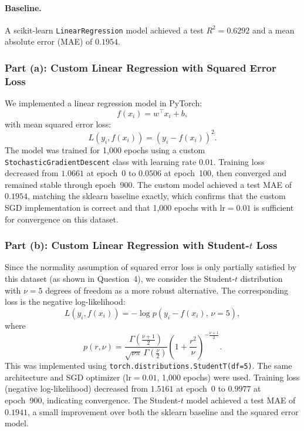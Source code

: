 \documentclass[11pt]{article}
\begin{document}
\paragraph{Baseline.}
A scikit-learn \texttt{LinearRegression} model achieved a test
$R^2 = 0.6292$ and a mean absolute error (MAE) of $\mathbf{0.1954}$.

\subsubsection*{Part (a): Custom Linear Regression with Squared Error Loss}

We implemented a linear regression model in PyTorch:
\[
    f(x_i) = w^\top x_i + b,
\]
with mean squared error loss:
\[
    L(y_i, f(x_i)) = (y_i - f(x_i))^2.
\]
The model was trained for 1{,}000 epochs using a custom
\texttt{StochasticGradientDescent} class with learning rate $0.01$.
Training loss decreased from $1.0661$ at epoch~0 to $0.0506$ at epoch~100,
then converged and remained stable through epoch~900. The custom model achieved
a test MAE of $\mathbf{0.1954}$, matching the sklearn baseline exactly,
which confirms that the custom SGD implementation is correct and that 1{,}000
epochs with $\text{lr}=0.01$ is sufficient for convergence on this dataset.

\subsubsection*{Part (b): Custom Linear Regression with Student-$t$ Loss}

Since the normality assumption of squared error loss is only partially
satisfied by this dataset (as shown in Question~4), we consider the
Student-$t$ distribution with $\nu = 5$ degrees of freedom as a more
robust alternative. The corresponding loss is the negative log-likelihood:
\[
    L(y_i, f(x_i)) = -\log p(y_i - f(x_i),\, \nu=5),
\]
where
\[
    p(r, \nu) = \frac{\Gamma\!\left(\frac{\nu+1}{2}\right)}{\sqrt{\nu\pi}\,\Gamma\!\left(\frac{\nu}{2}\right)}
    \left(1 + \frac{r^2}{\nu}\right)^{-\frac{\nu+1}{2}}.
\]
This was implemented using \texttt{torch.distributions.StudentT(df=5)}. The
same architecture and SGD optimizer (lr$=0.01$, 1{,}000 epochs) were used.
Training loss (negative log-likelihood) decreased from $1.5161$ at epoch~0 to
$0.9977$ at epoch~900, indicating convergence. The Student-$t$ model achieved
a test MAE of $\mathbf{0.1941}$, a small improvement over both the sklearn
baseline and the squared error model.
\end{document}
